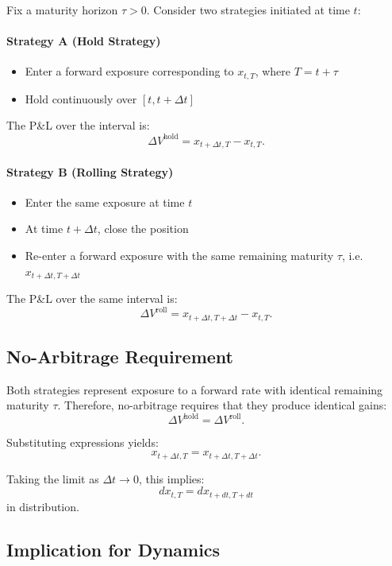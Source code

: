 \documentclass[12pt]{article}
\theoremstyle{statementstyle}
\begin{document}
\begin{appendices}
Fix a maturity horizon $\tau > 0$. Consider two strategies initiated at time $t$:

\paragraph{Strategy A (Hold Strategy)}
\begin{itemize}
\item Enter a forward exposure corresponding to $x_{t,T}$, where $T = t + \tau$
\item Hold continuously over $[t, t + \Delta t]$
\end{itemize}

The P\&L over the interval is:
\[
\Delta V^{\text{hold}} = x_{t+\Delta t, T} - x_{t,T}.
\]

\paragraph{Strategy B (Rolling Strategy)}
\begin{itemize}
\item Enter the same exposure at time $t$
\item At time $t + \Delta t$, close the position
\item Re-enter a forward exposure with the same remaining maturity $\tau$, i.e. $x_{t+\Delta t, T + \Delta t}$
\end{itemize}

The P\&L over the same interval is:
\[
\Delta V^{\text{roll}} = x_{t+\Delta t, T + \Delta t} - x_{t,T}.
\]

\subsection{No-Arbitrage Requirement}
\label{D.4}

Both strategies represent exposure to a forward rate with identical remaining maturity $\tau$. Therefore, no-arbitrage requires that they produce identical gains:
\[
\Delta V^{\text{hold}} = \Delta V^{\text{roll}}.
\]

Substituting expressions yields:
\[
x_{t+\Delta t, T} = x_{t+\Delta t, T + \Delta t}.
\]

Taking the limit as $\Delta t \to 0$, this implies:
\[
dx_{t,T} = dx_{t+dt, T+dt}
\]
in distribution.

\subsection{Implication for Dynamics}
\label{D.5}


\end{appendices}
\end{document}
